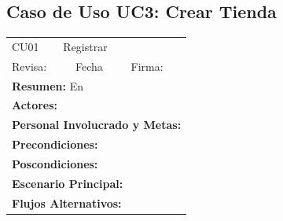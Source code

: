 
\subsection{Caso de Uso UC3: Crear Tienda}

\begin{longtable}{|l|p{5.5cm}|l|p{2cm}|l|p{1.9cm}|} \hline
    \cellcolor{grisOscuro} CU01 & \multicolumn{4}{|l|}{  \cellcolor{grisOscuro} Registrar} &  \cellcolor{grisClaro}\multirow{2}{1cm}{} \\ \cline{1-5}
    \cellcolor{grisOscuro} Revisa: &  \cellcolor{grisClaro} &  \cellcolor{grisOscuro} Fecha &  \cellcolor{grisClaro} &  \cellcolor{grisOscuro} Firma: & \cellcolor{grisClaro} \\ \hline
    \multicolumn{6}{|p{15cm}|}{ \textbf{Resumen: } En

    } \\ \hline

    \multicolumn{6}{|p{15cm}|}{ \textbf{Actores: }

    } \\ \hline

    \multicolumn{6}{|p{15cm}|}{ \textbf{Personal Involucrado y Metas: }

    } \\ \hline

    \multicolumn{6}{|p{15cm}|}{ \textbf{Precondiciones: }

    } \\ \hline

    \multicolumn{6}{|p{15cm}|}{ \textbf{Poscondiciones: }

    } \\ \hline

    \multicolumn{6}{|p{15cm}|}{ \textbf{Escenario Principal: }

    } \\ \hline

    \multicolumn{6}{|p{15cm}|}{ \textbf{Flujos Alternativos: }

    } \\ \hline

\end{longtable}

